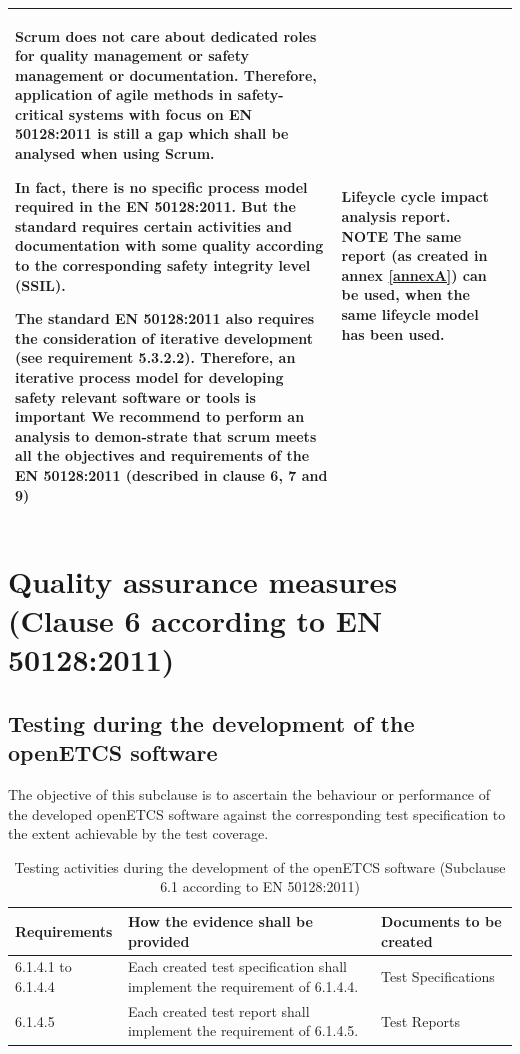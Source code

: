 \documentclass{template/openetcs_report}
\begin{document}
{\begin{longtable}{|p{2cm}|p{9cm}|p{3cm}|}
Scrum does not care about dedicated roles for quality management or safety management or documentation. Therefore, application of agile methods in safety-critical systems with focus on EN 50128:2011 is still a gap which shall be analysed when using Scrum.

In fact, there is no specific process model required in the EN 50128:2011. But the standard requires certain activities and documentation with some quality according to the corresponding safety integrity level (SSIL). 

The standard EN 50128:2011 also requires the consideration of iterative development (see requirement 5.3.2.2). Therefore, an iterative process model for developing safety relevant software or tools is important
We recommend to perform an analysis to demon-strate that scrum meets all the objectives and requirements of the EN 50128:2011 (described in clause 6, 7 and 9)
& Lifeycle cycle impact analysis report.
\linebreak
\linebreak
NOTE\linebreak
The same report (as created in annex \ref{annexA}) can be used, when the same lifeycle model has been used.\\ 
\hline
\end{longtable}}



\section{Quality assurance measures (Clause 6 according to EN 50128:2011)}
\label{clause62}
\subsection{Testing during the development of the openETCS software}
\begin{flushleft}
The objective of this subclause is to ascertain the behaviour or performance of the developed openETCS software against the corresponding test specification to the extent achievable by the test coverage.
\end{flushleft}
{\footnotesize\sffamily\centering
\begin{longtable}{|p{2cm}|p{9cm}|p{3cm}|}
\caption{Testing activities during the development of the openETCS software (Subclause 6.1 according to EN 50128:2011)}\\
\hline
\bfseries Requirements & \bfseries How the evidence shall be provided & \bfseries Documents to be created\\
\hline
\hline
\endhead
\hline
\endfoot

6.1.4.1 to 6.1.4.4 & Each created test specification shall implement the requirement of 6.1.4.4.
& Test Specifications \\ 
\hline
6.1.4.5 & Each created test report shall implement the requirement of 6.1.4.5.
& Test Reports \\ 
\hline
\end{longtable}}
\end{document}

